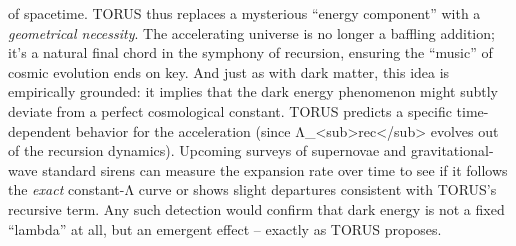 \documentclass[
]{article}
\begin{document}
of spacetime. TORUS thus replaces a mysterious ``energy component'' with
a \emph{geometrical necessity}. The accelerating universe is no longer a
baffling addition; it's a natural final chord in the symphony of
recursion, ensuring the ``music'' of cosmic evolution ends on key. And
just as with dark matter, this idea is empirically grounded: it implies
that the dark energy phenomenon might subtly deviate from a perfect
cosmological constant. TORUS predicts a specific time-dependent behavior
for the acceleration (since
Λ\_\textless sub\textgreater rec\textless/sub\textgreater{} evolves out
of the recursion dynamics)\hspace{0pt}. Upcoming surveys of supernovae
and gravitational-wave standard sirens can measure the expansion rate
over time to see if it follows the \emph{exact} constant-Λ curve or
shows slight departures consistent with TORUS's recursive
term\hspace{0pt}. Any such detection would confirm that dark energy is
not a fixed ``lambda'' at all, but an emergent effect -- exactly as
TORUS proposes.
\end{document}
